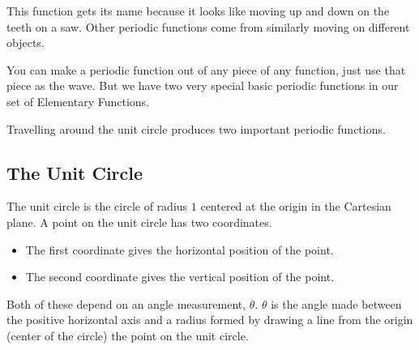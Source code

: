 \documentclass{ximera}
\begin{document}
This function gets its name because it looks like moving up and down on the teeth on a saw. Other periodic functions come from similarly moving on different objects. 




You can make a periodic function out of any piece of any function, just use that piece as the wave. But we have two very special basic periodic functions in our set of Elementary Functions.



Travelling around the unit circle produces two important periodic functions.














\subsection*{The Unit Circle}


The unit circle is the circle of radius $1$ centered at the origin in the Cartesian plane. A point on the unit circle has two coordinates.  

\begin{itemize}
\item The first coordinate gives the horizontal position of the point. 
\item The second coordinate gives the vertical position of the point.  
\end{itemize}

Both of these depend on an angle measurement, $\theta$. $\theta$ is the angle made between the positive horizontal axis and a radius formed by drawing a line from the origin (center of the circle) the point on the unit circle.
\end{document}
